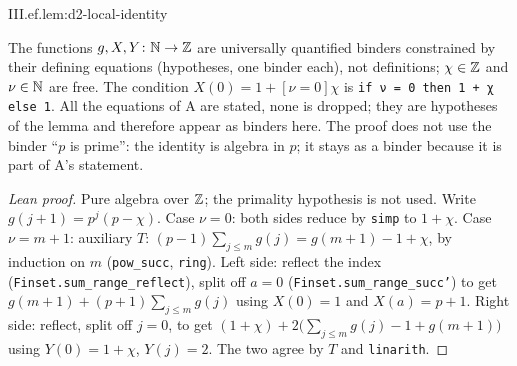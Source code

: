 \begin{lemma}
\end{lemma}
\begin{tfformal}{III.ef.lem:d2-local-identity}
\begin{tffidelity}
The functions $g,X,Y\colon\mathbb{N}\to\mathbb{Z}$ are universally quantified binders constrained by their defining equations (hypotheses, one binder each), not definitions; $\chi\in\mathbb{Z}$ and $\nu\in\mathbb{N}$ are free. The condition $X(0)=1+[\nu=0]\chi$ is \texttt{if ν = 0 then 1 + χ else 1}. All the equations of A are stated, none is dropped; they are hypotheses of the lemma and therefore appear as binders here. The proof does not use the binder ``$p$ is prime'': the identity is algebra in $p$; it stays as a binder because it is part of A's statement.
\end{tffidelity}
\end{tfformal}
\begin{proof}[Lean proof]
Pure algebra over $\mathbb{Z}$; the primality hypothesis is not used. Write $g(j+1)=p^j(p-\chi)$. Case $\nu=0$: both sides reduce by \texttt{simp} to $1+\chi$. Case $\nu=m+1$: auxiliary $T$: $(p-1)\sum_{j\le m}g(j)=g(m+1)-1+\chi$, by induction on $m$ (\texttt{pow\_succ}, \texttt{ring}). Left side: reflect the index (\texttt{Finset.sum\_range\_reflect}), split off $a=0$ (\texttt{Finset.sum\_range\_succ'}) to get $g(m+1)+(p+1)\sum_{j\le m}g(j)$ using $X(0)=1$ and $X(a)=p+1$. Right side: reflect, split off $j=0$, to get $(1+\chi)+2\bigl(\sum_{j\le m}g(j)-1+g(m+1)\bigr)$ using $Y(0)=1+\chi$, $Y(j)=2$. The two agree by $T$ and \texttt{linarith}.
\end{proof}

